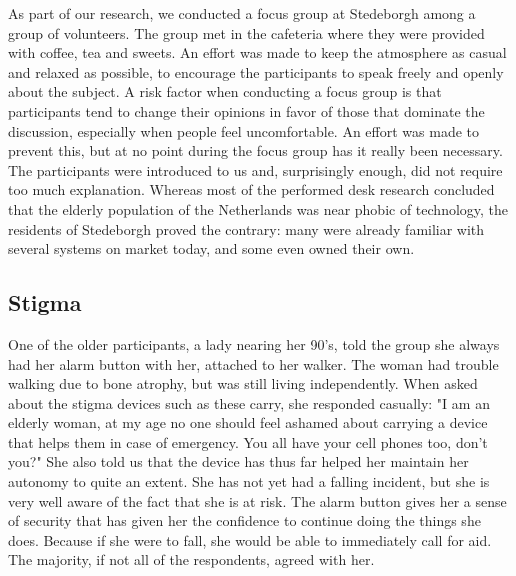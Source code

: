\documentclass{below-ext}
\begin{document}
As part of our research, we conducted a focus group at Stedeborgh among a group of volunteers. The group met in the cafeteria where they were provided with coffee, tea and sweets. An effort was made to keep the atmosphere as casual and relaxed as possible, to encourage the participants to speak freely and openly about the subject. A risk factor when conducting a focus group is that participants tend to change their opinions in favor of those that dominate the discussion, especially when people feel uncomfortable. An effort was made to prevent this, but at no point during the focus group has it really been necessary. The participants were introduced to us and, surprisingly enough, did not require too much explanation. Whereas most of the performed desk research concluded that the elderly population of the Netherlands was near phobic of technology, the residents of Stedeborgh proved the contrary: many were already familiar with several systems on market today, and some even owned their own.

\subsection{Stigma}
\label{ref:alarm_button}
 One of the older participants, a lady nearing her 90's, told the group she always had her alarm button with her, attached to her walker. The woman had trouble walking due to bone atrophy, but was still living independently. When asked about the stigma devices such as these carry, she responded casually: "I am an elderly woman, at my age no one should feel ashamed about carrying a device that helps them in case of emergency. You all have your cell phones too, don't you?" She also told us that the device has thus far helped her maintain her autonomy to quite an extent. She has not yet had a falling incident, but she is very well aware of the fact that she is at risk. The alarm button gives her a sense of security that has given her the confidence to continue doing the things she does. Because if she were to fall, she would be able to immediately call for aid. The majority, if not all of the respondents, agreed with her.
\end{document}
